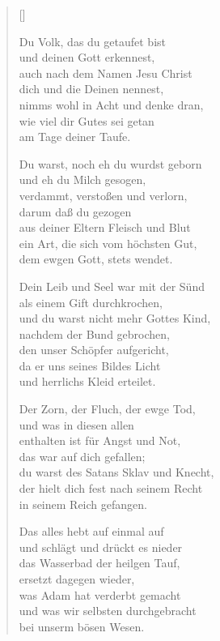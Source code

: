 \begin{multicols}{2}
\settowidth{\versewidth}{Du warst, noch eh du wurdst geborn}
\begin{verse}[\versewidth]

 Du Volk, das du getaufet bist\\
und deinen Gott erkennest,\\
auch nach dem Namen Jesu Christ\\
dich und die Deinen nennest,\\
nimms wohl in Acht und denke dran,\\
wie viel dir Gutes sei getan\\
am Tage deiner Taufe.

 Du warst, noch eh du wurdst geborn\\
und eh du Milch gesogen,\\
verdammt, verstoßen und verlorn,\\
darum daß du gezogen\\
aus deiner Eltern Fleisch und Blut\\
ein Art, die sich vom höchsten Gut,\\
dem ewgen Gott, stets wendet.

 Dein Leib und Seel war mit der Sünd\\
als einem Gift durchkrochen,\\
und du warst nicht mehr Gottes Kind,\\
nachdem der Bund gebrochen,\\
den unser Schöpfer aufgericht,\\
da er uns seines Bildes Licht\\
und herrlichs Kleid erteilet.

 Der Zorn, der Fluch, der ewge Tod,\\
und was in diesen allen\\
enthalten ist für Angst und Not,\\
das war auf dich gefallen;\\
du warst des Satans Sklav und Knecht,\\
der hielt dich fest nach seinem Recht\\
in seinem Reich gefangen.

 Das alles hebt auf einmal auf\\
und schlägt und drückt es nieder\\
das Wasserbad der heilgen Tauf,\\
ersetzt dagegen wieder,\\
was Adam hat verderbt gemacht\\
und was wir selbsten durchgebracht\\
bei unserm bösen Wesen.


\end{verse}
\end{multicols}
